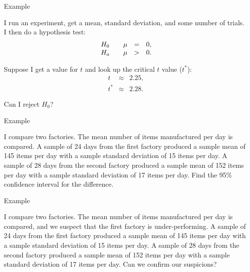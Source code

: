 \begin{frame}{Example}

  I run an experiment, get a mean, standard deviation, and some number
  of trials. I then do a hypothesis test:
  \begin{eqnarray*}
    \begin{array}{l@{\hspace{2em}}rcl}
      H_0 & \mu & = & 0, \\
      H_a & \mu & > & 0.
    \end{array}
  \end{eqnarray*}

  {
    Suppose I get a value for $t$ and look up the critical $t$ value
    ($t^*$):
    \begin{eqnarray*}
      t   & \approx & 2.25, \\
      t^* & \approx & 2.28.
    \end{eqnarray*}

    Can I reject $H_0$?

  }
  
\end{frame}

\begin{frame}{Example}

  I compare two factories. The mean number of items manufactured per
  day is compared. A sample of 24 days from the first factory produced
  a sample mean of 145 items per day with a sample standard deviation
  of 15 items per day. A sample of 28 days from the second factory
  produced a sample mean of 152 items per day with a sample standard
  deviation of 17 items per day. Find the 95\% confidence interval for
  the difference.
  
\end{frame}

\begin{frame}{Example}

  I compare two factories. The mean number of items manufactured per
  day is compared, and we suspect that the first factory is
  under-performing. A sample of 24 days from the first factory produced
  a sample mean of 145 items per day with a sample standard deviation
  of 15 items per day. A sample of 28 days from the second factory
  produced a sample mean of 152 items per day with a sample standard
  deviation of 17 items per day. Can we confirm our suspicions?
  
\end{frame}


